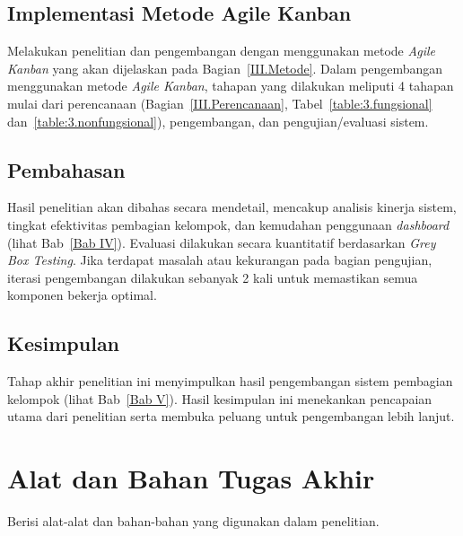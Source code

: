 \subsection{Implementasi Metode Agile Kanban}
Melakukan penelitian dan pengembangan dengan menggunakan metode \textit{Agile Kanban} yang akan dijelaskan pada Bagian~\ref{III.Metode}. Dalam pengembangan menggunakan metode \textit{Agile Kanban}, tahapan yang dilakukan meliputi 4 tahapan mulai dari perencanaan (Bagian~\ref{III.Perencanaan}, Tabel~\ref{table:3.fungsional} dan~\ref{table:3.nonfungsional}), pengembangan, dan pengujian/evaluasi sistem. \par

\subsection{Pembahasan}
Hasil penelitian akan dibahas secara mendetail, mencakup analisis kinerja sistem, tingkat efektivitas pembagian kelompok, dan kemudahan penggunaan \textit{dashboard} (lihat Bab~\ref{Bab IV}). Evaluasi dilakukan secara kuantitatif berdasarkan \textit{Grey Box Testing}. Jika terdapat masalah atau kekurangan pada bagian pengujian, iterasi pengembangan dilakukan sebanyak 2 kali untuk memastikan semua komponen bekerja optimal. \par

\subsection{Kesimpulan}
Tahap akhir penelitian ini menyimpulkan hasil pengembangan sistem pembagian kelompok (lihat Bab~\ref{Bab V}). Hasil kesimpulan ini menekankan pencapaian utama dari penelitian serta membuka peluang untuk pengembangan lebih lanjut. \par

\section{Alat dan Bahan Tugas Akhir}
Berisi alat-alat dan bahan-bahan yang digunakan dalam penelitian. \par

